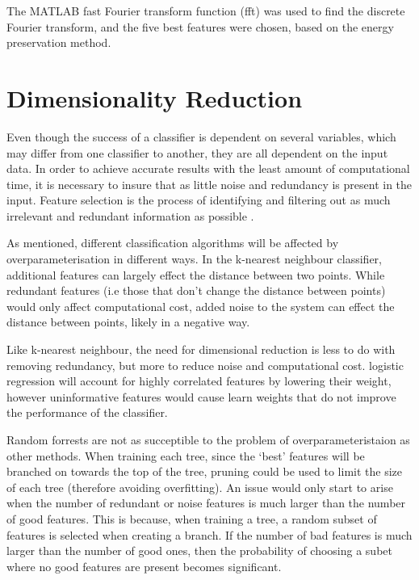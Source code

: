 The MATLAB fast Fourier transform function (fft) was used to find the discrete Fourier transform, and the five best features were chosen, based on the energy preservation method.


		
\section{Dimensionality Reduction}

Even though the success of a classifier is dependent on several variables, which may differ from one classifier to another, they are all dependent on the input data. In order to achieve accurate results with the least amount of computational time, it is necessary to insure that as little noise and redundancy is present in the input. Feature selection is the process of identifying and filtering out as much irrelevant and redundant information as possible \cite{Hall}. 

As mentioned, different classification algorithms will be affected by overparameterisation in different ways. In the k-nearest neighbour classifier, additional features can largely effect the distance between two points. While redundant features (i.e those that don't change the distance between points) would only affect computational cost, added noise to the system can effect the distance between points, likely in a negative way. 

Like k-nearest neighbour, the need for dimensional reduction is less to do with removing redundancy, but more to reduce noise and computational cost. logistic regression will account for highly correlated features by lowering their weight, however uninformative features would cause learn weights that do not improve the performance of the classifier.

Random forrests are not as succeptible to the problem of overparameteristaion as other methods. When training each tree, since the `best' features will be branched on towards the top of the tree, pruning could be used to limit the size of each tree (therefore avoiding overfitting). An issue would only start to arise when the number of redundant or noise features is much larger than the number of good features. This is because, when training a tree, a random subset of features is selected when creating a branch. If the number of bad features is much larger than the number of good ones, then the probability of choosing a subet where no good features are present becomes significant.

